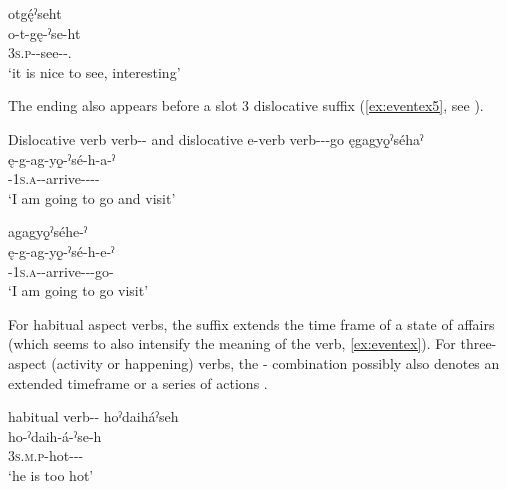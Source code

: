 \ea\label{ex:eventex7} otgę́ˀseht\\
\gll o-t-gę-ˀse-ht \\
\textsc{3s.p}-{\semireflexive}-see-{\distributive}-\exsc{\causative}.{\stative}\\
\glt ‘it is nice to see, interesting’ 
\z

The  ending also appears before a slot 3 dislocative suffix (\ref{ex:eventex5}, see ).

\ea\label{ex:eventex5} Dislocative verb  verb-{\distributive}-{\dislocative} and dislocative e-verb  verb-{\distributive}-\exsc{\dislocative}-go
\ea ęgagyǫ̱ˀséhaˀ\\
\gll ę-g-ag-yǫ̱-ˀsé-h-a-ˀ\\
 \fut-\textsc{1s.a}-{\semireflexive}-arrive-{\distributive}-{\dislocative}-{\joinerA}-{\punctual}\\
\glt `I am going to go and visit'

\newpage
{}

\ex agagyǫ̱ˀséhe-ˀ\\
\gll ę-g-ag-yǫ̱-ˀsé-h-e-ˀ\\
 \fut-\textsc{1s.a}-{\semireflexive}-arrive-{\distributive}-{\dislocative}-go-\exsc{\punctual}\\
\glt `I am going to go visit'

\z
\z

For habitual aspect verbs, the  suffix extends the time frame of a state of affairs (which seems to also intensify the meaning of the verb, \ref{ex:eventex}). For three-aspect (activity or happening) verbs, the  {\joinerA}-\exsc{\distributive} combination possibly also denotes an extended timeframe or a series of actions .

\ea\label{ex:eventex}  habitual  verb-{\distributive}-{\habitual}
\ea hoˀdaiháˀseh\\
\gll ho-ˀdaih-á-ˀse-h\\
 \textsc{3s.m.p}-hot-{\joinerA}-{\distributive}-{\habitual}\\
\glt `he is too hot'


